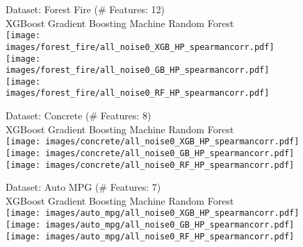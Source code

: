  \begin{figure}[h]
    \centering
    \scriptsize
    Dataset: Forest Fire (\# Features: 12) \\%
     XGBoost  \hspace{1.7cm} Gradient Boosting Machine \hspace{1cm} Random Forest \\ 
    \texttt{[image: images/forest\_fire/all\_noise0\_XGB\_HP\_spearmancorr.pdf]}
    \texttt{[image: images/forest\_fire/all\_noise0\_GB\_HP\_spearmancorr.pdf]}
    \texttt{[image: images/forest\_fire/all\_noise0\_RF\_HP\_spearmancorr.pdf]}
    
    Dataset: Concrete (\# Features: 8) \\
     XGBoost  \hspace{1.7cm} Gradient Boosting Machine \hspace{1cm} Random Forest \\ 
    \texttt{[image: images/concrete/all\_noise0\_XGB\_HP\_spearmancorr.pdf]} 
    \texttt{[image: images/concrete/all\_noise0\_GB\_HP\_spearmancorr.pdf]} 
    \texttt{[image: images/concrete/all\_noise0\_RF\_HP\_spearmancorr.pdf]} 
    
    Dataset: Auto MPG (\# Features: 7) \\%
     XGBoost  \hspace{1.7cm} Gradient Boosting Machine \hspace{1cm} Random Forest \\ 
    \texttt{[image: images/auto\_mpg/all\_noise0\_XGB\_HP\_spearmancorr.pdf]}
    \texttt{[image: images/auto\_mpg/all\_noise0\_GB\_HP\_spearmancorr.pdf]}
    \texttt{[image: images/auto\_mpg/all\_noise0\_RF\_HP\_spearmancorr.pdf]}
    

\end{figure}
